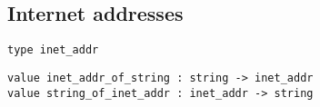 \subsection*{Internet addresses }\begin{verbatim}
type inet_addr
\end{verbatim}
\begin{comment}
 The abstract type of Internet addresses. 
\end{comment}
\begin{verbatim}
value inet_addr_of_string : string -> inet_addr
value string_of_inet_addr : inet_addr -> string
\end{verbatim}
%
%
\begin{comment}
 Conversions between string with the format \verbXXX.YYY.ZZZ.TTT
           and Internet addresses. \verbinet_addr_of_string raises \verbFailure
           when given a string that does not match this format. 
\end{comment}
